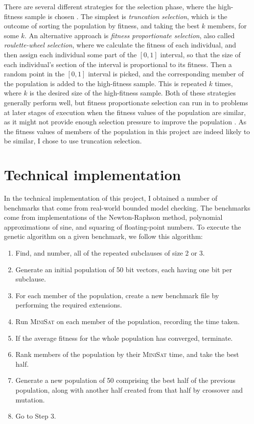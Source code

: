 \documentclass[proof,pdftex,11pt,a4,titlepage]{article}
\begin{document}
There are several different strategies for the selection phase, where the high-fitness sample is chosen \cite{Thierens:1994}. The simplest is \emph{truncation selection}, which is the outcome of sorting the population by fitness, and taking the best $k$ members, for some $k$. An alternative approach is \emph{fitness proportionate selection}, also called \emph{roulette-wheel selection}, where we calculate the fitness of each individual, and then assign each individual some part of the $[0,1]$ interval, so that the size of each individual's section of the interval is proportional to its fitness. Then a random point in the $[0,1]$ interval is picked, and the corresponding member of the population is added to the high-fitness sample. This is repeated $k$ times, where $k$ is the desired size of the high-fitness sample. Both of these strategies generally perform well, but fitness proportionate selection can run in to problems at later stages of execution when the fitness values of the population are similar, as it might not provide enough selection pressure to improve the population \cite{Whitley:1989}. As the fitness values of members of the population in this project are indeed likely to be similar, I chose to use truncation selection.


\section{Technical implementation}

In the technical implementation of this project, I obtained a number of benchmarks that come from real-world bounded model checking. The benchmarks come from implementations of the Newton-Raphson method, polynomial approximations of sine, and squaring of floating-point numbers. To execute the genetic algorithm on a given benchmark, we follow this algorithm:

\begin{samepage}
  \begin{enumerate}
    \item Find, and number, all of the repeated subclauses of size 2 or 3.
    \item Generate an initial population of 50 bit vectors, each having one bit per subclause.
    \item For each member of the population, create a new benchmark file by performing the required extensions.
    \item Run \textsc{MiniSat} on each member of the population, recording the time taken.
    \item If the average fitness for the whole population has converged, terminate.
    \item Rank members of the population by their \textsc{MiniSat} time, and take the best half.
    \item Generate a new population of 50 comprising the best half of the previous population, along with another half created from that half by crossover and mutation.
    \item Go to Step 3.
  \end{enumerate}
\end{samepage}
\end{document}
